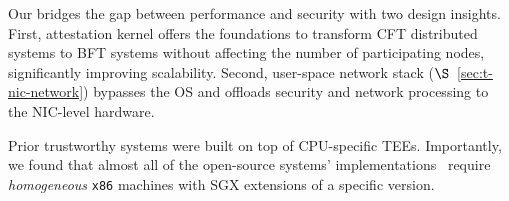 Our \projecttitle{} bridges the gap between performance and security with two design insights. 
First, \projecttitle{} attestation kernel offers the foundations to transform CFT distributed systems to BFT systems without affecting the number of participating nodes, significantly improving scalability. 
Second, \projecttitle{} user-space network stack ($\S$~\ref{sec:t-nic-network}) bypasses the OS and offloads security and network processing to the NIC-level hardware. 







 Prior trustworthy systems were built on top of CPU-specific TEEs. Importantly, we found that almost all of the open-source systems' implementations~\cite{hybster, 10.1145/3492321.3519568, minBFT, DBLP:journals/corr/LiuLKA16a} require {\em homogeneous} {\tt x86} machines with SGX extensions of a specific version.

